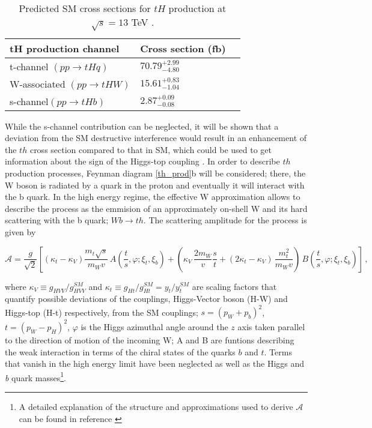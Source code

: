 \begin{center}
\begin{table}[h]
\centering
\begin{tabular}{lll}\hline
tH production channel       & Cross section (fb)      \\\hline
t-channel $(pp \to tHq)$    & $70.79^{+2.99}_{-4.80}$ \\
W-associated $(pp \to tHW)$ & $15.61^{+0.83}_{-1.04}$ \\
s-channel$(pp \to tHb)$     & $ 2.87^{+0.09}_{-0.08}$ \\\hline
\end{tabular}
\caption[Predicted SM cross sections for tH production at $\sqrt{s}=13$ TeV.]{Predicted SM cross sections for $tH$ production at $\sqrt{s}=13$ TeV \cite{thqw_xsec, thb_xsec}.}\label{tab:th_xsec}
\end{table}
\end{center}

\noindent While the s-channel contribution can be neglected, it will be shown that a deviation from the SM destructive interference would result in an enhancement of the $th$ cross section compared to that in SM, which could be used to get information about the sign of the Higgs-top coupling \cite{farina,tait}. In order to describe $th$ production processes, Feynman diagram \ref{th_prod}b will be considered; there, the W boson is radiated by a quark in the proton and eventually it will interact with the b quark. In the high energy regime, the effective W approximation\cite{dawson} allows to describe the process as the emmision of an approximately on-shell W and its hard scattering with the b quark; \ie $Wb \to th$. The scattering amplitude for the process is given by

\begin{equation} \label{s_amp}
\mathcal{A}= \frac{g}{\sqrt{2}}\left[(\kappa_t-\kappa_V)\frac{m_t\sqrt{s}}{m_Wv}\,A\left(\frac{t}{s},\varphi; \xi_{t},\xi_{b}\right)+\left(\kappa_V\,\frac{2m_W}{v}\frac{s}{t}+(2\kappa_t-\kappa_V)\,\frac{m_t^{2}}{m_Wv}\right)\,B\left(\frac{t}{s},\varphi; \xi_{t},\xi_{b}\right)\right]\,,
\end{equation}

\noindent where $\kappa_V\equiv g_{HVV}/g_{HVV}^{SM}$ and $\kappa_t\equiv g_{Ht}/g_{Ht}^{SM}=y_t/y_t^{SM}$ are scaling factors that quantify possible deviations of the couplings, Higgs-Vector boson (H-W) and Higgs-top (H-t) respectively, from the SM couplings; $s=(p_{W}+p_{b})^{2}$, $t=(p_{W}-p_{H})^{2}$, $\varphi$ is the Higgs azimuthal angle around the $z$ axis taken parallel to the direction of motion of the incoming W; A and B are funtions describing the weak interaction in terms of the chiral states of the quarks $b$ and $t$. Terms that vanish in the high energy limit have been neglected as well as the Higgs and \textit{b} quark masses\footnote{A detailed explanation of the structure and approximations used to derive $\mathcal{A}$ can be found in reference \cite{farina}}.\\        

